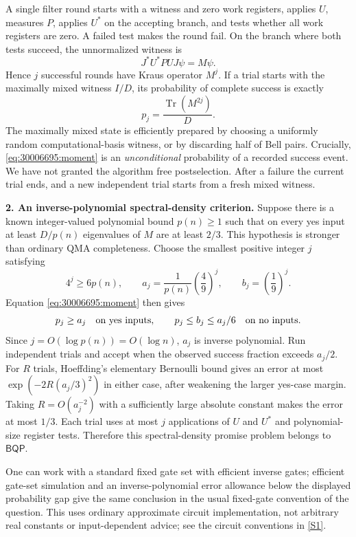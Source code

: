\documentclass[11pt,a4paper]{article}
\newcommand{\sref}[2]{\hyperlink{source:#1:#2}{[S#2]}}
\numberwithin{equation}{section}
\begin{document}
A single filter round starts with a witness and zero work registers,
applies $U$, measures $P$, applies $U^*$ on the accepting branch, and tests
whether all work registers are zero. A failed test makes the round fail.
On the branch where both tests succeed, the unnormalized witness is
\[
 J^*U^*PUJ\psi=M\psi.
\]
Hence $j$ successful rounds have Kraus operator $M^j$. If a trial starts
with the maximally mixed witness $I/D$, its probability of complete success
is exactly
\begin{equation}\label{eq:30006695:moment}
 p_j=\frac{\operatorname{Tr}(M^{2j})}{D}.
\end{equation}
The maximally mixed state is efficiently prepared by choosing a uniformly
random computational-basis witness, or by discarding half of Bell pairs.
Crucially, \eqref{eq:30006695:moment} is an \emph{unconditional} probability of a
recorded success event. We have not granted the algorithm free postselection.
After a failure the current trial ends, and a new independent trial starts
from a fresh mixed witness.

\textbf{2. An inverse-polynomial spectral-density criterion.}
Suppose there is a known integer-valued polynomial bound $p(n)\ge1$ such
that on every yes input at least $D/p(n)$ eigenvalues of $M$ are at least
$2/3$. This hypothesis is stronger than ordinary QMA completeness.
Choose the smallest positive integer $j$ satisfying
\[
 4^j\ge6p(n),\qquad
 a_j=\frac1{p(n)}\left(\frac49\right)^j,\qquad
 b_j=\left(\frac19\right)^j.
\]
Equation \eqref{eq:30006695:moment} then gives
\[
 p_j\ge a_j\quad\hbox{on yes inputs},\qquad
 p_j\le b_j\le a_j/6\quad\hbox{on no inputs}.
\]
Since $j=O(\log p(n))=O(\log n)$, $a_j$ is inverse polynomial.
Run independent trials and accept when the observed success fraction
exceeds $a_j/2$. For $R$ trials, Hoeffding's elementary Bernoulli bound gives
an error at most $\exp(-2R(a_j/3)^2)$ in either case, after weakening the
larger yes-case margin. Taking $R=O(a_j^{-2})$ with a sufficiently large
absolute constant makes the error at most $1/3$. Each trial uses at most
$j$ applications of $U$ and $U^*$ and polynomial-size register tests.
Therefore this spectral-density promise problem belongs to $\mathsf{BQP}$.

One can work with a standard fixed gate set with efficient inverse gates;
efficient gate-set simulation and an inverse-polynomial error allowance
below the displayed probability gap give the same conclusion in the usual
fixed-gate convention of the question. This uses ordinary approximate
circuit implementation, not arbitrary real constants or input-dependent
advice; see the circuit conventions in \sref{30006695}{1}.
\end{document}
